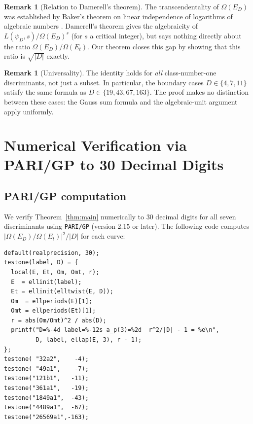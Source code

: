 \documentclass[12pt,a4paper]{article}
\theoremstyle{plain}
\theoremstyle{definition}
\newtheorem{remark}[theorem]{Remark}
\begin{document}
\begin{remark}[Relation to Damerell's theorem]
The transcendentality of $\Omega(E_D)$ was established by Baker's theorem on
linear independence of logarithms of algebraic numbers
\cite{Baker1966}.  Damerell's theorem \cite{Damerell1971a}
gives the algebraicity of $L(\psi_D, s) / \Omega(E_D)^s$ (for $s$ a critical
integer), but says nothing directly about the ratio $\Omega(E_D)/\Omega(E_t)$.
Our theorem closes this gap by showing that this ratio is $\sqrt{|D|}$ exactly.
\end{remark}

\begin{remark}[Universality]
The identity holds for \emph{all} class-number-one discriminants, not just
a subset.  In particular, the boundary cases $D \in \{4, 7, 11\}$ satisfy
the same formula as $D \in \{19, 43, 67, 163\}$.  The proof makes no
distinction between these cases: the Gauss sum formula and the algebraic-unit
argument apply uniformly.
\end{remark}

\section{Numerical Verification via PARI/GP to 30 Decimal Digits}
\label{sec:numerical}

\subsection{PARI/GP computation}

We verify Theorem~\ref{thm:main} numerically to 30 decimal digits for all
seven discriminants using \texttt{PARI/GP} (version 2.15 or later).  The
following code computes $|\Omega(E_D)/\Omega(E_t)|^2 / |D|$ for each curve:

\begin{verbatim}
default(realprecision, 30);
testone(label, D) = {
  local(E, Et, Om, Omt, r);
  E  = ellinit(label);
  Et = ellinit(elltwist(E, D));
  Om  = ellperiods(E)[1];
  Omt = ellperiods(Et)[1];
  r = abs(Om/Omt)^2 / abs(D);
  printf("D=%-4d label=%-12s a_p(3)=%2d  r^2/|D| - 1 = %e\n",
         D, label, ellap(E, 3), r - 1);
};
testone( "32a2",    -4);
testone( "49a1",    -7);
testone("121b1",   -11);
testone("361a1",   -19);
testone("1849a1",  -43);
testone("4489a1",  -67);
testone("26569a1",-163);
\end{verbatim}
\end{document}

